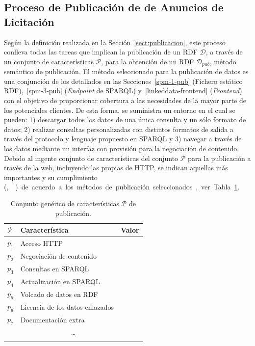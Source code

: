 \subsection{Proceso de Publicación de \linkeddata de Anuncios de Licitación}\label{sect:proceso-publicacion-ld}
Según la definición realizada en la Sección~\ref{sect:publicacion}, este proceso conlleva
todas las tareas que implican la publicación de un \dataset RDF $\mathcal{D}$, a través de un conjunto 
de características $\mathcal{P}$, para la obtención de un \dataset RDF $\mathcal{D}_{pub}$, método semántico 
de publicación. El método seleccionado para la publicación de datos es una conjunción 
de los detallados en las Secciones~\ref{spm-1-pub} (Fichero estático \gls{RDF}),~\ref{spm-3-pub} (\textit{Endpoint} de SPARQL) y~\ref{linkeddata-frontend} 
(\linkeddata \textit{Frontend}) con el objetivo de proporcionar cobertura a las necesidades de la mayor parte de los potenciales clientes. De esta forma, 
se suministra un entorno en el cual se pueden: 1) descargar todos los datos de una única consulta y un sólo formato de datos; 2) realizar consultas personalizadas 
con distintos formatos de salida a través del protocolo y lenguaje propuesto en \gls{SPARQL} y 3) navegar a través de los datos mediante un interfaz con provisión 
para la negociación de contenido. 
% 
Debido al ingente conjunto de características del conjunto $\mathcal{P}$ para la publicación a través de la web, 
incluyendo las propias de HTTP, se indican aquellas más importantes y su cumplimiento (\si, \no) de acuerdo 
a los métodos de publicación seleccionados, ver Tabla~\ref{table:pscs-publish}.
% 
\begin{longtable}[c]{|p{2cm}|p{8cm}|p{4cm}|} 
\hline
  \textbf{$\mathcal{P}$} &  \textbf{Característica} & \textbf{Valor} \\\hline
\endhead
 $p_1$ & Acceso HTTP  & \si \\ \hline
 $p_2$ & Negociación de contenido  & \si \\ \hline
 $p_3$ & Consultas en SPARQL & \si \\ \hline
 $p_4$ & Actualización en SPARQL & \si \\ \hline
 $p_5$ & Volcado de datos en RDF & \si \\ \hline 
 $p_6$ & Licencia de los datos enlazados & \si \\ \hline
 $p_7$ & Documentación extra & \si \\ \hline  
  \multicolumn{3}{|c|}{\ldots} \\ \hline
\hline
\caption{Conjunto genérico de características $\mathcal{P}$ de publicación.}\label{table:pscs-publish}\\    
\end{longtable}
% 
% 
